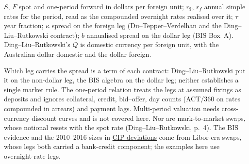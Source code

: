 \begin{qfmethod}
 $S$, $F$ spot and one-period forward in dollars per foreign unit; $r_{\$}$, $r_f$ annual simple rates for the period, read as the compounded overnight rates realised over it; $\tau$ year fraction; $\kappa$ spread on the foreign leg (Du--Tepper--Verdelhan and the Ding--Liu--Rutkowski contract); $b$ annualised spread on the dollar leg (BIS Box~A). Ding--Liu--Rutkowski's $Q$ is domestic currency per foreign unit, with the Australian dollar domestic and the dollar foreign.

 Which leg carries the spread is a term of each contract: Ding--Liu--Rutkowski put it on the non-dollar leg, the BIS algebra on the dollar leg; neither establishes a single market rule. The one-period relation treats the legs at assumed fixings as deposits and ignores collateral, credit, bid--offer, day counts (ACT/360 on rates compounded in arrears) and payment lags. Multi-period valuation needs cross-currency discount curves and is not covered here. Nor are mark-to-market swaps, whose notional resets with the spot rate (Ding--Liu--Rutkowski, p.~4). The BIS evidence and the 2010--2016 sizes in \hyperref[ev:cip-deviations]{CIP deviations} come from Libor-era swaps, whose legs both carried a bank-credit component; the examples here use overnight-rate legs.


\end{qfmethod}
